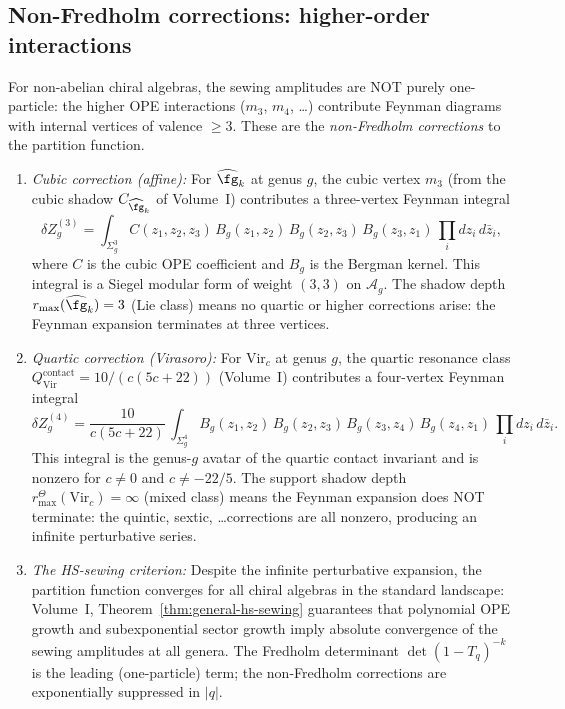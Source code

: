 \subsection{Non-Fredholm corrections: higher-order interactions}

\begin{remark}
For non-abelian chiral algebras, the sewing amplitudes are NOT
purely one-particle: the higher OPE interactions ($m_3$, $m_4$,
\ldots) contribute Feynman diagrams with internal vertices of
valence $\ge 3$. These are the \emph{non-Fredholm corrections}
to the partition function.

\begin{enumerate}[label=\textup{(\roman*)}]
\item \emph{Cubic correction (affine):}
For $\widehat{\fg}_k$ at genus $g$, the cubic vertex $m_3$
(from the cubic shadow $C_{\widehat{\fg}_k}$ of Volume~I)
contributes a three-vertex Feynman integral
\[
\delta Z_g^{(3)}
= \int_{\Sigma_g^3}
C(z_1, z_2, z_3)\,
B_g(z_1, z_2)\, B_g(z_2, z_3)\, B_g(z_3, z_1)\,
\prod_i dz_i\, d\bar{z}_i,
\]
where $C$ is the cubic OPE coefficient and $B_g$ is the
Bergman kernel. This integral is a Siegel modular form
of weight $(3, 3)$ on $\mathcal{A}_g$. The shadow depth
$r_{\max}(\widehat{\fg}_k) = 3$ (Lie class) means no
quartic or higher corrections arise: the Feynman expansion
terminates at three vertices.

\item \emph{Quartic correction (Virasoro):}
For $\mathrm{Vir}_c$ at genus $g$, the quartic resonance
class $Q^{\mathrm{contact}}_{\mathrm{Vir}} = 10/(c(5c+22))$
(Volume~I) contributes a four-vertex Feynman integral
\[
\delta Z_g^{(4)}
= \frac{10}{c(5c+22)}\,
\int_{\Sigma_g^4}
B_g(z_1, z_2)\, B_g(z_2, z_3)\, B_g(z_3, z_4)\,
B_g(z_4, z_1)\,
\prod_i dz_i\, d\bar{z}_i.
\]
This integral is the genus-$g$ avatar of the quartic contact
invariant and is nonzero for $c \ne 0$ and $c \ne -22/5$.
The support shadow depth \(r^\Theta_{\max}(\mathrm{Vir}_c)=\infty\) (mixed
class) means the Feynman expansion does NOT terminate: the
quintic, sextic, \ldots corrections are all nonzero, producing
an infinite perturbative series.

\item \emph{The HS-sewing criterion:}
Despite the infinite perturbative expansion, the partition
function converges for all chiral algebras in the standard
landscape: Volume~I, Theorem~\ref*{thm:general-hs-sewing}
guarantees that polynomial OPE growth and subexponential
sector growth imply absolute convergence of the sewing
amplitudes at all genera. The Fredholm determinant $\det(1-T_q)^{-k}$
is the leading (one-particle) term; the non-Fredholm corrections
are exponentially suppressed in $|q|$.
\end{enumerate}
\end{remark}

